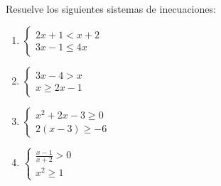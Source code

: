 \Exercicio Resuelve los siguientes sistemas de inecuaciones:

\begin{enumerate}[topsep=0pt]
	\item $ \begin{cases}
		2x+1 < x+2 \\
		3x-1  \le 4x
	\end{cases}  $
	\item $ \begin{cases}
		3x - 4 > x \\
		x \ge 2x -1
	\end{cases}  $
	\item $ \begin{cases}
		x^2 +2x -3 \ge 0 \\
		2(x-3) \ge -6
	\end{cases}  $
	\item $ \begin{cases}
		\frac{x-1}{x+2} >	 0 \\
		x^2 \ge 1
	\end{cases}  $
\end{enumerate}





